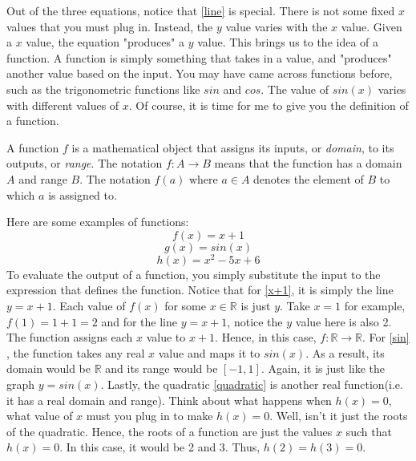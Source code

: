   Out of the three equations, notice that \ref{line} is special. There is not some fixed \(x\) values that you must plug in. Instead, the \(y\) value varies with the \(x\) value. Given a \(x\) value, the equation "produces" a \(y\) value. This brings us to the idea of a function. A function is simply something that takes in a value, and "produces" another value based on the input. You may have came across functions before, such as the trigonometric functions like \(sin\) and \(cos\). The value of \(sin(x)\) varies with different values of \(x\). Of course, it is time for me to give you the definition of a function. 
  \begin{definition}
    A function \(f\) is a mathematical object that assigns its inputs, or \textit{domain}, to its outputs, or \textit{range}. The notation \(f:A \to B\) means that the function has a domain \(A\) and range \(B\). The notation \(f(a)\) where \(a \in A\) denotes the element of \(B\) to which \(a\) is assigned to.    
  \end{definition}
  \begin{example}
    Here are some examples of functions:
    \begin{equation}
      f(x)=x+1 
      \label{x+1}
    \end{equation}
    \begin{equation}
      \label{sin}
      g(x)=sin(x)
    \end{equation}
    \begin{equation}
      \label{quadratic}
      h(x)=x^2-5x+6
    \end{equation}
    \quad \quad To evaluate the output of a function, you simply substitute the input to the expression that defines the function. Notice that for \ref{x+1}, it is simply the line \(y=x+1\). Each value of \(f(x)\) for some \(x \in \mathbb{R}\) is just \(y\). Take \(x=1\) for example, \(f(1)=1+1=2\) and for the line \(y=x+1\), notice the \(y\) value here is also 2. The function assigns each \(x\) value to \(x+1\). Hence, in this case, \(f:\mathbb{R} \to \mathbb{R}\). For \ref{sin} , the function takes any real \(x\) value and maps it to \(sin(x)\). As a result, its domain would be \(\mathbb{R}\) and its range would be \([-1,1]\). Again, it is just like the graph \(y=sin(x)\). \newpage 
   \quad \quad Lastly, the quadratic \ref{quadratic} is another real function(i.e. it has a real domain and range). Think about what happens when \(h(x)=0\), what value of \(x\) must you plug in to make \(h(x)=0\). Well, isn't it just the roots of the quadratic. Hence, the roots of a function are just the values \(x\) such that \(h(x)=0\). In this case, it would be 2 and 3. Thus, \(h(2)=h(3)=0\).
  \end{example}
